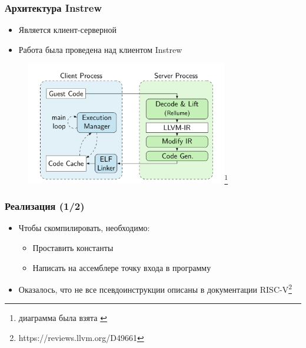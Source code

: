 \documentclass{beamer}
\begin{document}
\begin{frame}[fragile]
  \frametitle{Архитектура Instrew}
  \begin{itemize}
    \item Является клиент-серверной
    \item Работа была проведена над клиентом Instrew
  \end{itemize}
  \begin{figure}
    \centering
      \includegraphics[width=250pt]{pictures/instrew-arch-disser.png}\footnote{диаграмма была взята \href{https://mediatum.ub.tum.de/doc/1614897/1614897.pdf}{\color{blue}{отсюда}}}
  \end{figure}
\end{frame}

\begin{frame}[fragile]
  \frametitle{Реализация (1/2)}
  \begin{itemize}
    \item Чтобы скомпилировать, необходимо:
          \begin{itemize}
            \item Проставить константы
            \item Написать на ассемблере точку входа в программу
          \end{itemize}
    \item Оказалось, что не все псевдоинструкции описаны в документации RISC-V\footnote{https://reviews.llvm.org/D49661}
  \end{itemize}
\end{frame}
\end{document}
